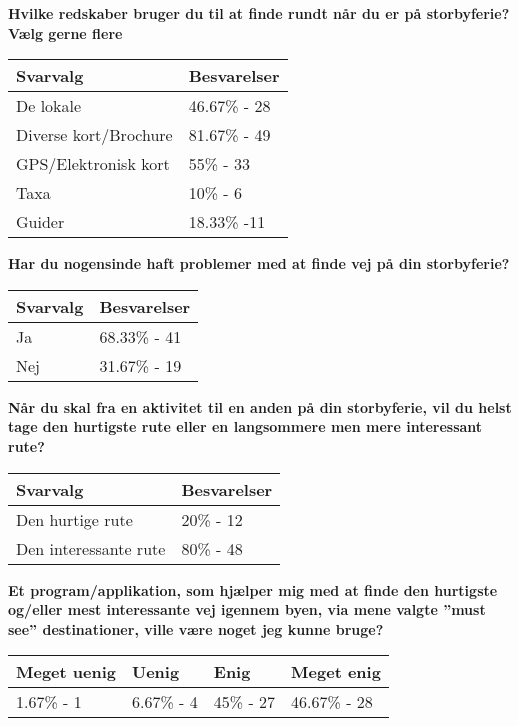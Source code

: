 \textbf{Hvilke redskaber bruger du til at finde rundt når du er på storbyferie?
Vælg gerne flere}

	\begin{tabular}{| l | l |}
	\hline
	Svarvalg & Besvarelser \\ \hline
	De lokale & 46.67\% - 28 \\ \hline
	Diverse kort/Brochure & 81.67\% - 49 \\ \hline
	GPS/Elektronisk kort & 55\% - 33 \\ \hline
	Taxa & 10\% - 6 \\ \hline
	Guider & 18.33\% -11 \\
	\hline
	\end{tabular}
\newline
\newline 	


\textbf{Har du nogensinde haft problemer med at finde vej på din storbyferie?}

	\begin{tabular}{| l | l |}
	\hline
	Svarvalg & Besvarelser \\ \hline
	Ja & 68.33\% - 41 \\ \hline
	Nej & 31.67\% - 19 \\
	\hline
	\end{tabular}
\newline
\newline

\textbf{Når du skal fra en aktivitet til en anden på din storbyferie, vil du helst tage den hurtigste rute eller en langsommere men mere interessant rute?}

	\begin{tabular}{| l | l |}
	\hline
	Svarvalg & Besvarelser \\ \hline
	Den hurtige rute & 20\% - 12 \\ \hline
	Den interessante rute & 80\% - 48 \\
	\hline
	\end{tabular}
\newline
\newline

\textbf{Et program/applikation, som hjælper mig med at finde den hurtigste og/eller mest interessante vej igennem byen, via mene valgte ”must see” destinationer, ville være noget jeg kunne bruge?}

\begin{center}
	\begin{tabular}{| l | l | l | l |}
    \hline
    Meget uenig & Uenig & Enig & Meget enig \\ \hline
    1.67\% - 1 & 6.67\% - 4 & 45\% - 27 & 46.67\% - 28 \\
    \hline
    \end{tabular}
\end{center}
